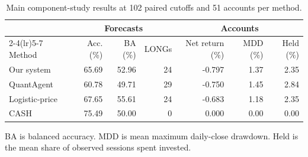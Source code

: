 \begin{table}[!htb]
\centering\small
\setlength{\tabcolsep}{6pt}
\renewcommand{\arraystretch}{1.13}
\caption{Main component-study results at 102 paired cutoffs and 51 accounts per method.}
\label{tab:classification}
\begin{tabular}{@{}lrrrrrr@{}}
\toprule
& \multicolumn{3}{c}{Forecasts} & \multicolumn{3}{c}{Accounts}\\
\cmidrule(lr){2-4}\cmidrule(lr){5-7}
Method & Acc. (\%) & BA (\%) & LONGs & Net return (\%) & MDD (\%) & Held (\%)\\
\midrule
Our system & 65.69 & 52.96 & 24 & -0.797 & 1.37 & 2.35\\
QuantAgent & 60.78 & 49.71 & 29 & -0.750 & 1.45 & 2.84\\
Logistic-price & 67.65 & 55.61 & 24 & -0.683 & 1.18 & 2.35\\
CASH & 75.49 & 50.00 & 0 & 0.000 & 0.00 & 0.00\\
\bottomrule
\end{tabular}
\par\smallskip
{\footnotesize BA is balanced accuracy. MDD is mean maximum daily-close drawdown.
Held is the mean share of observed sessions spent invested.\par}
\end{table}

